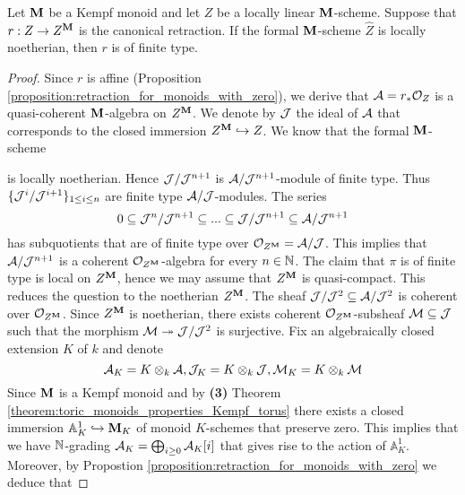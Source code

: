 \begin{theorem}\label{theorem:if_formal_neighborhood_is_locally_noetherian_then_canonical_retraction_is_of_finite_type}
Let $\mathbf{M}$ be a Kempf monoid and let $Z$ be a locally linear $\mathbf{M}$-scheme. Suppose that $r:Z\rightarrow Z^{\mathbf{M}}$ is the canonical retraction. If the formal $\mathbf{M}$-scheme $\widehat{Z}$ is locally noetherian, then $r$ is of finite type.
\end{theorem}
\begin{proof}
Since $r$ is affine (Proposition \ref{proposition:retraction_for_monoids_with_zero}), we derive that ${\mathcal A} = r_*{\mathcal O}_Z$ is a quasi-coherent $\mathbf{M}$-algebra on $Z^{\mathbf{M}}$. We denote by ${\mathcal J}$ the ideal of ${\mathcal A}$ that corresponds to the closed immersion $Z^{\mathbf{M}}\hookrightarrow Z$. We know that the formal $\mathbf{M}$-scheme
\begin{center}
\end{center}
is locally noetherian. Hence ${\mathcal J}/{\mathcal J}^{n+1}$ is ${\mathcal A}/{\mathcal J}^{n+1}$-module of finite type. Thus $\{{\mathcal J}^i/{\mathcal J}^{i+1}\}_{1\leq i\leq n}$ are finite type ${\mathcal A}/{\mathcal J}$-modules. The series
$$0 \subseteq {\mathcal J}^n/{\mathcal J}^{n+1} \subseteq  ... \subseteq {\mathcal J}/{\mathcal J}^{n+1} \subseteq {\mathcal A}/{\mathcal J}^{n+1}$$
has subquotients that are of finite type over ${\mathcal O}_{Z^{\mathbf{M}}} = {\mathcal A}/{\mathcal J}$. This implies that ${\mathcal A}/{\mathcal J}^{n+1}$ is a coherent ${\mathcal O}_{Z^{\mathbf{M}}}$-algebra for every $n\in {\mathbb N}$. The claim that $\pi$ is of finite type is local on $Z^{\mathbf{M}}$, hence we may assume that $Z^{\mathbf{M}}$ is quasi-compact. This reduces the question to the noetherian $Z^{\mathbf{M}}$. The sheaf ${\mathcal J}/{\mathcal J}^2\subseteq {\mathcal A}/{\mathcal J}^2$ is coherent over ${\mathcal O}_{Z^{\mathbf{M}}}$. Since $Z^{\mathbf{M}}$ is noetherian, there exists coherent ${\mathcal O}_{Z^{\mathbf{M}}}$-subsheaf ${\mathcal M}\subseteq {\mathcal J}$ such that the morphism ${\mathcal M}\twoheadrightarrow {\mathcal J}/{\mathcal J}^2$ is surjective. Fix an algebraically closed extension $K$ of $k$ and denote
$${\mathcal A}_K = K\otimes_k{\mathcal A},{\mathcal J}_K = K\otimes_k{\mathcal J},{\mathcal M}_K = K\otimes_k{\mathcal M}$$
Since $\mathbf{M}$ is a Kempf monoid and by \textbf{(3)} Theorem \ref{theorem:toric_monoids_properties_Kempf_torus} there exists a closed immersion $\mathbb{A}^1_K\hookrightarrow \mathbf{M}_K$ of monoid $K$-schemes that preserve zero. This implies that we have ${\mathbb N}$-grading ${\mathcal A}_K = \bigoplus_{i\geq 0}{\mathcal A}_K[i]$ that gives rise to the action of $\mathbb{A}^1_K$. Moreover, by Propostion \ref{proposition:retraction_for_monoids_with_zero} we deduce that

\end{proof}
